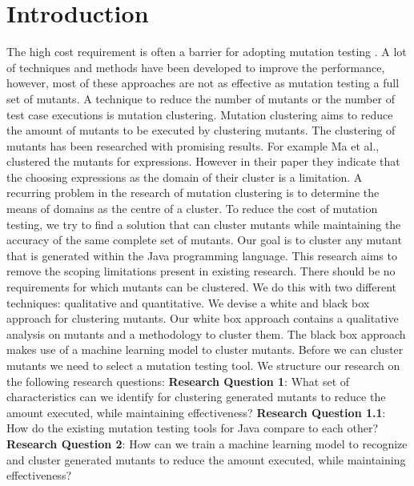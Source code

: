 \documentclass[conference,draftclsnofoot,onecolumn]{IEEEtran}
\begin{document}
\begin{IEEEkeywords}

\end{IEEEkeywords}

\section{Introduction}
The high cost requirement is often a barrier for adopting mutation testing \cite{Pizzoleto2019}.
A lot of techniques and methods have been developed to improve the performance, however, most of these approaches are not as effective as mutation testing a full set of mutants\cite{Pizzoleto2019,Yao2014}. 
\newline
A technique to reduce the number of mutants or the number of test case executions is mutation clustering.
Mutation clustering aims to reduce the amount of mutants to be executed by clustering mutants\cite{Ma2016,Yu2019PossibilityScope}.
The clustering of mutants has been researched with promising results\cite{Ji2009,Wilinski2015,Ma2016}. For example Ma et al., \cite{Ma2016} clustered the mutants for expressions. 
However in their paper they indicate that the choosing expressions as the domain of their cluster is a limitation.
A recurring problem in the research of mutation clustering is to determine the means of domains as the centre of a cluster\cite{Ji2009,Wilinski2015,Ma2016,Wei2021SpectralTesting}.
\newline
To reduce the cost of mutation testing, we try to find a solution that can cluster mutants while maintaining the accuracy of the same complete set of mutants. 
Our goal is to cluster any mutant that is generated within the Java programming language.
This research aims to remove the scoping limitations present in existing research.
There should be no requirements for which mutants can be clustered.
We do this with two different techniques: qualitative and quantitative.
We devise a white and black box approach for clustering mutants.
Our white box approach contains a qualitative analysis on mutants and a methodology to cluster them.
The black box approach makes use of a machine learning model to cluster mutants.
Before we can cluster mutants we need to select a mutation testing tool.
We structure our research on the following research questions:
\newline
\textbf{Research Question 1}: What set of characteristics can we identify for clustering generated mutants to reduce the amount executed, while maintaining effectiveness?
\newline
\textbf{Research Question 1.1}: How do the existing mutation testing tools for Java compare to each other?
\newline
\textbf{Research Question 2}: How can we train a machine learning model to recognize and cluster generated mutants to reduce the amount executed, while maintaining effectiveness?
\end{document}
